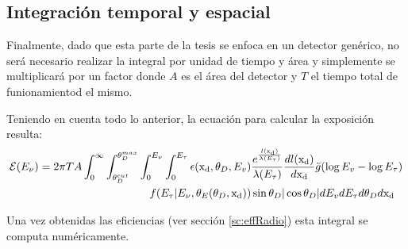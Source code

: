 	\subsection{Integraci\'on temporal y espacial}
	Finalmente, dado que esta parte de la tesis se enfoca en un detector gen\'erico, no ser\'a necesario realizar la integral por unidad de tiempo y \'area y simplemente se multiplicar\'a por un factor donde $A$ es el \'area del detector y $T$ el tiempo total de funionamientod el mismo.
	
	Teniendo en cuenta todo lo anterior, la ecuaci\'on para calcular la exposici\'on resulta:
	\begin{equation}
		\begin{aligned}
			{\cal E} (E_\nu) = 2 \pi T A
			\int_{0}^{\infty} 
			\int_{\theta_D^{cut}}^{\theta_D^{max}} 
			\int_{0}^{E_\nu} 
			\int_{0}^{E_\tau} 
			\epsilon ({\rm x_d},\theta_D,E_v)& 
			\frac{e^{\frac{l({\rm x_d})}{\lambda(E_\tau)}}}{\lambda(E_\tau)}\frac{dl({\rm x_d})}{d{\rm x_d}}
			\tilde{g}(\log E_v-\log E_\tau)\\
			f(E_\tau|E_\nu,\theta_E(\theta_D,{\rm x_d}))
			&\sin \theta_D |\cos \theta_D|
			dE_v dE_\tau  d\theta_D d{\rm x_d}
		\end{aligned}
		\label{eq:exp2ESRadio}
	\end{equation}

	Una vez obtenidas las eficiencias (ver secci\'on \ref{sc:effRadio}) esta integral se computa num\'ericamente.
	
	
